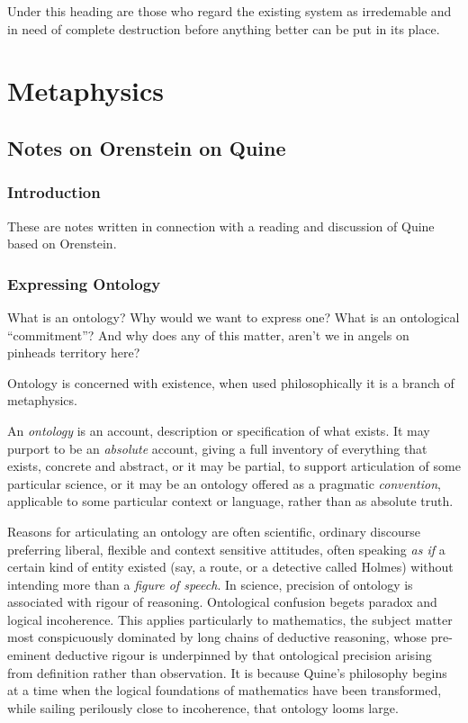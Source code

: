 \documentclass[10pt,titlepage]{book}
\begin{document}
Under this heading are those who regard the existing system as irredemable and in need of complete destruction before anything better can be put in its place.

\cite{pluckrose-cynical,lindsay-racemarx,friere-poled,gottesman-criturn}

\part{Metaphysics}

\chapter{Notes on Orenstein on Quine}

\section{Introduction}

These are notes written in connection with a reading and discussion of Quine based on Orenstein.

\section{Expressing Ontology}

What is an ontology? Why would we want to express one? What is an ontological ``commitment''?
And why does any of this matter, aren't we in angels on pinheads territory here?

Ontology is concerned with existence, when used philosophically it is a branch of metaphysics.

An \emph{ontology} is an account, description or specification of what exists.
It may purport to be an \emph{absolute} account, giving a full inventory of everything that exists, concrete and abstract, or it may be partial, to support articulation of some particular science, or it may be an ontology offered as a pragmatic {\it convention}, applicable to some particular context or language, rather than as absolute truth.

Reasons for articulating an ontology are often scientific, ordinary discourse preferring liberal, flexible and context sensitive attitudes, often speaking {\it as if} a certain kind of entity existed (say, a route, or a detective called Holmes) without intending more than a {\it figure of speech}.
In science, precision of ontology is associated with rigour of reasoning.
Ontological confusion begets paradox and logical incoherence.
This applies particularly to mathematics, the subject matter most conspicuously dominated by long chains of deductive reasoning, whose pre-eminent deductive rigour is underpinned by that ontological precision arising from definition rather than observation.
It is because Quine's philosophy begins at a time when the logical foundations of mathematics have been transformed, while sailing perilously close to incoherence, that ontology looms large.
\end{document}
